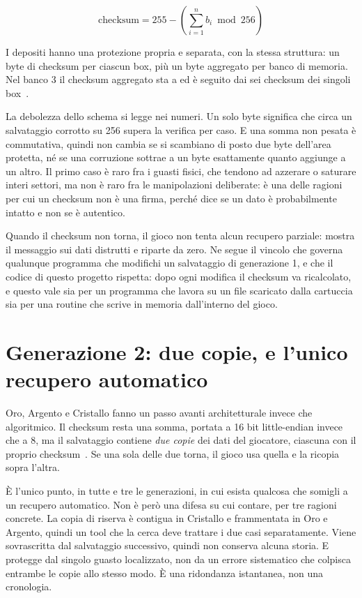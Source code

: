 \[
  \mathrm{checksum} = 255 - \left( \sum_{i=1}^{n} b_i \bmod 256 \right)
\]

I depositi hanno una protezione propria e separata, con la stessa struttura: un byte di
checksum per ciascun box, più un byte aggregato per banco di memoria. Nel banco 3 il
checksum aggregato sta a  ed è seguito dai sei checksum dei singoli
box~\cite{pokered}.

La debolezza dello schema si legge nei numeri. Un solo byte significa che circa un
salvataggio corrotto su 256 supera la verifica per caso. E una somma non pesata è
commutativa, quindi non cambia se si scambiano di posto due byte dell'area protetta, né se
una corruzione sottrae a un byte esattamente quanto aggiunge a un altro. Il primo caso è
raro fra i guasti fisici, che tendono ad azzerare o saturare interi settori, ma non è raro
fra le manipolazioni deliberate: è una delle ragioni per cui un checksum non è una firma,
perché dice se un dato è probabilmente intatto e non se è autentico.

Quando il checksum non torna, il gioco non tenta alcun recupero parziale: mostra il
messaggio sui dati distrutti e riparte da zero. Ne segue il vincolo che governa qualunque
programma che modifichi un salvataggio di generazione 1, e che il codice di questo progetto
rispetta: dopo ogni modifica il checksum va ricalcolato, e questo vale sia per un programma
che lavora su un file scaricato dalla cartuccia sia per una routine che scrive in memoria
dall'interno del gioco.

\section{Generazione 2: due copie, e l'unico recupero automatico}

Oro, Argento e Cristallo fanno un passo avanti architetturale invece che algoritmico. Il
checksum resta una somma, portata a 16 bit little-endian invece che a 8, ma il salvataggio
contiene \emph{due copie} dei dati del giocatore, ciascuna con il proprio
checksum~\cite{pokecrystal}. Se una sola delle due torna, il gioco usa quella e la ricopia
sopra l'altra.

È l'unico punto, in tutte e tre le generazioni, in cui esista qualcosa che somigli a un
recupero automatico. Non è però una difesa su cui contare, per tre ragioni concrete. La
copia di riserva è contigua in Cristallo e frammentata in Oro e Argento, quindi un tool
che la cerca deve trattare i due casi separatamente. Viene sovrascritta dal salvataggio
successivo, quindi non conserva alcuna storia. E protegge dal singolo guasto localizzato,
non da un errore sistematico che colpisca entrambe le copie allo stesso modo. È una
ridondanza istantanea, non una cronologia.

